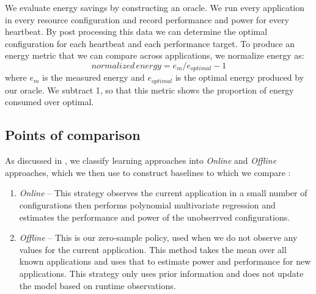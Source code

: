 We evaluate energy savings by constructing an oracle.  We run every
application in every resource configuration and record performance and
power for every heartbeat.  By post processing this data we can
determine the optimal configuration for each heartbeat and each
performance target. To produce an energy metric that we can compare
across applications, we normalize energy as:
\begin{equation}
  normalized\,energy = e_m / e_{optimal} - 1
\end{equation}
where $e_m$ is the measured energy and $e_{optimal}$ is the optimal
energy produced by our oracle. We subtract 1, so that this metric
shows the proportion of energy consumed over optimal.  


\subsection{Points of comparison}
As discussed in , we classify learning approaches
into \emph{Online} and \emph{Offline} approaches, which we then use to
construct baselines to which we compare \SYSTEM{}:
\begin{enumerate}
\item \textit{Online} -- This strategy observes the current
  application in a small number of configurations then performs
  polynomial multivariate regression and estimates the performance and
  power of the unobserrved configurations. 
\item \textit{Offline} -- This is our zero-sample policy, used when we
  do not observe any values for the current application. This method
  takes the mean over all known applications and uses that to estimate
  power and performance for new applications.  This strategy only uses
  prior information and does not update the model based on runtime
  observations.
\end{enumerate}

